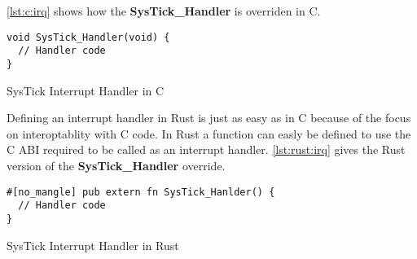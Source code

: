 \autoref{lst:c:irq} shows how the \textbf{SysTick\_Handler} is overriden in C.

\begin{listing}[H]
  \begin{verbatim}
void SysTick_Handler(void) {
  // Handler code
}
  \end{verbatim}
  \caption{SysTick Interrupt Handler in C}
  \label{lst:c:irq}
\end{listing}

Defining an interrupt handler in Rust is just as easy as in C because of the focus on interoptablity with C code.
In Rust a function can easly be defined to use the C ABI required to be called as an interrupt handler.
\autoref{lst:rust:irq} gives the Rust version of the \textbf{SysTick\_Handler} override.

\begin{listing}[H]
  \begin{verbatim}
#[no_mangle] pub extern fn SysTick_Hanlder() {
  // Handler code
}
  \end{verbatim}
  \caption{SysTick Interrupt Handler in Rust}
  \label{lst:rust:irq}
\end{listing}
